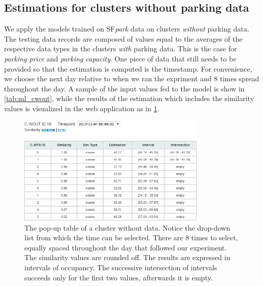 	\subsection{Estimations for clusters without parking data}
	We apply the models trained on SF\textit{park} data on clusters \textit{without} parking data.
	The testing data records are composed of values equal to the averages of the respective data types in the clusters \textit{with} parking data.
	This is the case for \textit{parking price} and \textit{parking capacity}.
	One piece of data that still needs to be provided so that the estimation is computed is the timestamp.
	For convenience, we choose the next day relative to when we ran the expriment and 8 times spread throughout the day.
	A sample of the input values fed to the model is show in \cref{tab:ml_cwout}, while the results of the estimation which includes the similarity values is visualized in the web application as in \cref{fig:cwout_table}.
	
	\begin{figure}[!ht]
		\centering
		\includegraphics[width=0.8\textwidth]{graphics/cwout_cosine_table.png}
		\caption{The pop-up table of a cluster without data.
			Notice the drop-down list from which the time can be selected. There are 8 times to select, equally spaced throughout the day that followed our experiment. The similarity values are rounded off. The results are expressed in intervals of occupancy. The successive intersection of intervals succeeds only for the first two values, afterwards it is empty.}
		\label{fig:cwout_table}
	\end{figure}
	
